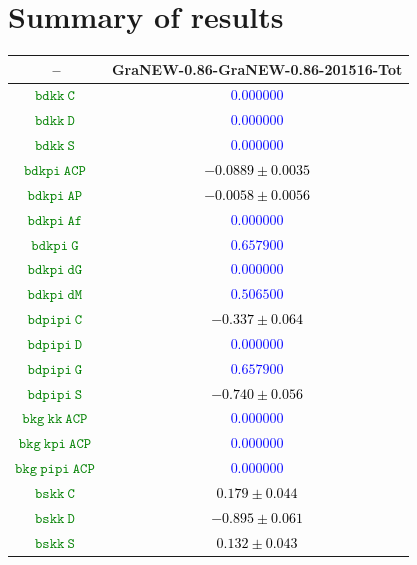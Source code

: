 \documentclass[10pt,a4paper]{article}
\begin{document}
\section{Summary of results}
\begin{table}[h!]
\centering
\begin{tabular}{cc}
\hline
 \textbf{--} & \textbf{GraNEW-0.86-GraNEW-0.86-201516-Tot}\\
\hline
\textcolor{Green}{$\mathtt{bdkk~C~}$} & \textcolor{blue}{$0.000000$}\\
\textcolor{Green}{$\mathtt{bdkk~D~}$} & \textcolor{blue}{$0.000000$}\\
\textcolor{Green}{$\mathtt{bdkk~S~}$} & \textcolor{blue}{$0.000000$}\\
\textcolor{Green}{$\mathtt{bdkpi~ACP~}$} & \textcolor{black}{$-0.0889 \pm 0.0035$}\\
\textcolor{Green}{$\mathtt{bdkpi~AP~}$} & \textcolor{black}{$-0.0058 \pm 0.0056$}\\
\textcolor{Green}{$\mathtt{bdkpi~Af~}$} & \textcolor{blue}{$0.000000$}\\
\textcolor{Green}{$\mathtt{bdkpi~G~}$} & \textcolor{blue}{$0.657900$}\\
\textcolor{Green}{$\mathtt{bdkpi~dG~}$} & \textcolor{blue}{$0.000000$}\\
\textcolor{Green}{$\mathtt{bdkpi~dM~}$} & \textcolor{blue}{$0.506500$}\\
\textcolor{Green}{$\mathtt{bdpipi~C~}$} & \textcolor{black}{$-0.337 \pm 0.064$}\\
\textcolor{Green}{$\mathtt{bdpipi~D~}$} & \textcolor{blue}{$0.000000$}\\
\textcolor{Green}{$\mathtt{bdpipi~G~}$} & \textcolor{blue}{$0.657900$}\\
\textcolor{Green}{$\mathtt{bdpipi~S~}$} & \textcolor{black}{$-0.740 \pm 0.056$}\\
\textcolor{Green}{$\mathtt{bkg~kk~ACP~}$} & \textcolor{blue}{$0.000000$}\\
\textcolor{Green}{$\mathtt{bkg~kpi~ACP~}$} & \textcolor{blue}{$0.000000$}\\
\textcolor{Green}{$\mathtt{bkg~pipi~ACP~}$} & \textcolor{blue}{$0.000000$}\\
\textcolor{Green}{$\mathtt{bskk~C~}$} & \textcolor{black}{$0.179 \pm 0.044$}\\
\textcolor{Green}{$\mathtt{bskk~D~}$} & \textcolor{black}{$-0.895 \pm 0.061$}\\
\textcolor{Green}{$\mathtt{bskk~S~}$} & \textcolor{black}{$0.132 \pm 0.043$}\\

\end{tabular}
\end{table}
\end{document}

